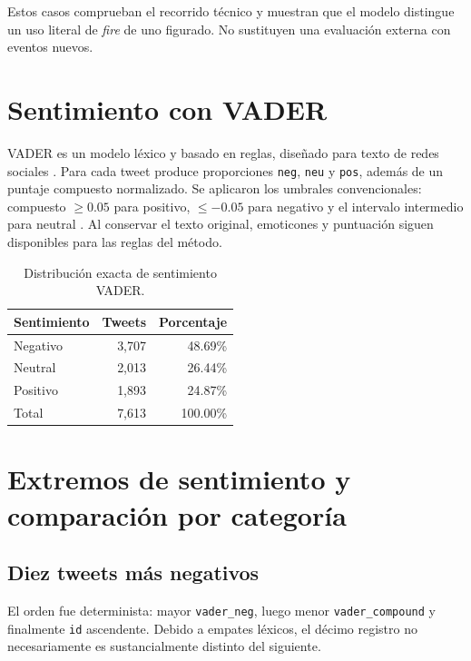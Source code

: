 \documentclass[11pt,letterpaper]{article}
\newcommand{\code}[1]{\texttt{#1}}
\begin{document}
Estos casos comprueban el recorrido técnico y muestran que el modelo distingue un uso literal de \emph{fire} de uno figurado. No sustituyen una evaluación externa con eventos nuevos.

\section{Sentimiento con VADER}

VADER es un modelo léxico y basado en reglas, diseñado para texto de redes sociales \cite{hutto2014}. Para cada tweet produce proporciones \code{neg}, \code{neu} y \code{pos}, además de un puntaje compuesto normalizado. Se aplicaron los umbrales convencionales: compuesto $\geq 0.05$ para positivo, $\leq -0.05$ para negativo y el intervalo intermedio para neutral \cite{nltkvader}. Al conservar el texto original, emoticones y puntuación siguen disponibles para las reglas del método.

\begin{table}[H]
\centering
\caption{Distribución exacta de sentimiento VADER.}
\label{tab:sentimiento}
\begin{tabular}{@{}lrr@{}}
\toprule
Sentimiento & Tweets & Porcentaje \\
\midrule
Negativo & 3,707 & 48.69\% \\
Neutral & 2,013 & 26.44\% \\
Positivo & 1,893 & 24.87\% \\
\midrule
Total & 7,613 & 100.00\% \\
\bottomrule
\end{tabular}
\end{table}

\section{Extremos de sentimiento y comparación por categoría}

\subsection{Diez tweets más negativos}

El orden fue determinista: mayor \code{vader\_neg}, luego menor \code{vader\_compound} y finalmente \code{id} ascendente. Debido a empates léxicos, el décimo registro no necesariamente es sustancialmente distinto del siguiente.
\end{document}
